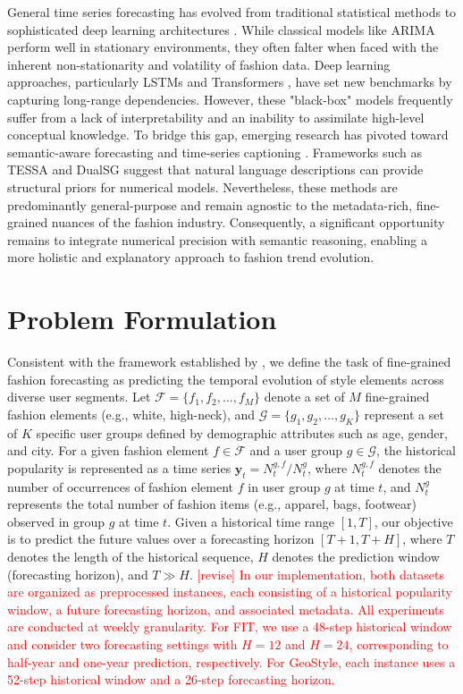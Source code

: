 \documentclass[Afour,sageh,times]{sagej}
\newcommand{\zhang}[1]{\textcolor{red}{[revise] #1}}
\begin{document}
{General time series forecasting has evolved from traditional statistical methods to sophisticated deep learning architectures \cite{lea2016temporal, wang2018attentive}. While classical models like ARIMA \cite{box2015time} perform well in stationary environments, they often falter when faced with the inherent non-stationarity and volatility of fashion data. Deep learning approaches, particularly LSTMs \cite{salinas2020deepar} and Transformers \cite{wang2023destformer, su2025systematic}, have set new benchmarks by capturing long-range dependencies. However, these "black-box" models frequently suffer from a lack of interpretability and an inability to assimilate high-level conceptual knowledge. To bridge this gap, emerging research has pivoted toward semantic-aware forecasting and time-series captioning \cite{jhamtani2021truth, trabelsi2025time}. Frameworks such as TESSA \cite{lin2024decoding} and DualSG \cite{ding2025dualsg} suggest that natural language descriptions can provide structural priors for numerical models. Nevertheless, these methods are predominantly general-purpose and remain agnostic to the metadata-rich, fine-grained nuances of the fashion industry. Consequently, a significant opportunity remains to integrate numerical precision with semantic reasoning, enabling a more holistic and explanatory approach to fashion trend evolution.

\section{Problem Formulation}

Consistent with the framework established by \citet{ma2020knowledge}, we define the task of fine-grained fashion forecasting as predicting the temporal evolution of style elements across diverse user segments.
Let $\mathcal{F} = \{f_1, f_2, \dots, f_M\}$ denote a set of $M$ fine-grained fashion elements (e.g., white, high-neck), and $\mathcal{G} = \{g_1, g_2, \dots, g_{K}\}$ represent a set of $K$ specific user groups defined by demographic attributes such as age, gender, and city. For a given fashion element $f \in \mathcal{F}$ and a user group $g \in \mathcal{G}$, the historical popularity is represented as a time series $\mathbf{y}_{t} = N^{g,f}_t/N_t^g$, where $N^{g,f}_t$ denotes the number of occurrences of fashion element $f$ in user group $g$ at time $t$, and $N_t^g$ represents the total number of fashion items (e.g., apparel, bags, footwear) observed in group $g$ at time $t$. Given a historical time range $[1, T]$, our objective is to predict the future values over a forecasting horizon $[T+1, T+H]$, where $T$ denotes the length of the historical sequence, $H$ denotes the prediction window (forecasting horizon), and $T \gg H$. \zhang{In our implementation, both datasets are organized as preprocessed instances, each consisting of a historical popularity window, a future forecasting horizon, and associated metadata. All experiments are conducted at weekly granularity. For FIT, we use a 48-step historical window and consider two forecasting settings with $H=12$ and $H=24$, corresponding to half-year and one-year prediction, respectively. For GeoStyle, each instance uses a 52-step historical window and a 26-step forecasting horizon.}

}
\end{document}
